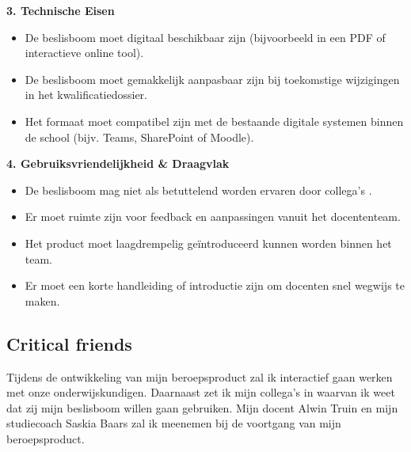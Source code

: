 \textbf{3. Technische Eisen}
\begin{itemize}
    \item De beslisboom moet digitaal beschikbaar zijn (bijvoorbeeld in een PDF of interactieve online tool).
    \item De beslisboom moet gemakkelijk aanpasbaar zijn bij toekomstige wijzigingen in het kwalificatiedossier.
    \item Het formaat moet compatibel zijn met de bestaande digitale systemen binnen de school (bijv. Teams, SharePoint of Moodle).
\end{itemize}

\textbf{4. Gebruiksvriendelijkheid \& Draagvlak}
\begin{itemize}
    \item De beslisboom mag niet als betuttelend worden ervaren door collega's
    .
    \item Er moet ruimte zijn voor feedback en aanpassingen vanuit het docententeam.
    \item Het product moet laagdrempelig geïntroduceerd kunnen worden binnen het team.
    \item Er moet een korte handleiding of introductie zijn om docenten snel wegwijs te maken.
\end{itemize}

\subsection{Critical friends}
Tijdens de ontwikkeling van mijn beroepsproduct zal ik interactief gaan werken met onze onderwijskundigen. Daarnaast zet ik mijn collega's
 in waarvan ik weet dat zij mijn beslisboom willen gaan gebruiken. Mijn docent Alwin Truin en mijn studiecoach Saskia Baars zal ik meenemen bij de voortgang van mijn beroepsproduct. 

